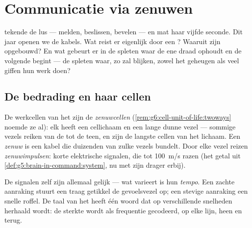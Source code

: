 \chapter{Communicatie via zenuwen}\label{ch:g8:nervous-communication}

 tekende de lus --- melden, beslissen,
bevelen --- en mat haar vijfde seconde. Dit jaar openen we de kabels. Wat
reist er eigenlijk door een ? Waaruit zijn  opgebouwd? En wat
gebeurt er in de spleten waar de ene draad ophoudt en de volgende begint
--- de spleten waar, zo zal blijken, zowel het geheugen als veel giffen
hun werk doen?

\section{De bedrading en haar cellen}

\begin{definition}\label{def:g8:nervous-communication:neuron}
De werkcellen van het  zijn de
\emph{zenuwcellen}
(\cref{rem:g6:cell-unit-of-life:twoways} noemde ze al): elk heeft een
cellichaam en een lange dunne vezel --- sommige vezels reiken van de
 tot de teen, en zijn de langste cellen van het lichaam. Een
\emph{zenuw} is een kabel die duizenden van zulke vezels
bundelt. Door elke vezel reizen \emph{zenuwimpulsen}:
korte elektrische signalen, die tot \qty{100}{m/s} razen (het getal uit
\cref{def:g5:brain-in-command:system}, nu met zijn drager erbij).
\end{definition}

\begin{proposition}\label{prop:g8:nervous-communication:code}
De signalen zelf zijn allemaal gelijk --- wat varieert is hun
\emph{tempo}. Een zachte aanraking stuurt een traag getikkel de
gevoelsvezel op; een stevige aanraking een snelle roffel. De taal van het
 heeft één woord dat op verschillende snelheden herhaald
wordt: de sterkte wordt als frequentie gecodeerd, op elke lijn, heen en
terug.
\end{proposition}
\admitted

